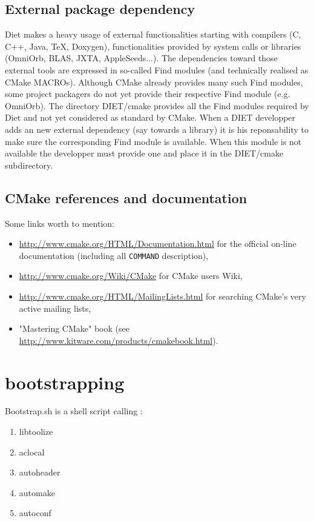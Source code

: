 \subsection{External package dependency}
Diet makes a heavy usage of external functionalities starting with
compilers (C, C++, Java, TeX, Doxygen), functionalities provided by system
calls or libraries (OmniOrb, BLAS, JXTA, AppleSeeds...).
The dependencies toward those external tools are expressed in so-called
Find modules (and technically realised as CMake MACROs).
Although CMake already provides many such Find modules, some project 
packagers do not yet provide their respective Find module (e.g. OmniOrb).
The directory DIET/cmake provides all the Find modules required by Diet
and not yet considered as standard by CMake.
When a DIET developper adds an new external dependency (say towards a
library) it is his reponsability to make sure the corresponding 
Find module is available. When this module is not available the
developper must provide one and place it in the DIET/cmake subdirectory.

\subsection{CMake references and documentation}
Some links worth to mention:
\begin{itemize}
\item \url{http://www.cmake.org/HTML/Documentation.html} for the official
      on-line documentation (including all \texttt{COMMAND} description),
\item \url{http://www.cmake.org/Wiki/CMake} for CMake users Wiki,
\item \url{http://www.cmake.org/HTML/MailingLists.html} for searching
      CMake's very active mailing lists,
\item "Mastering CMake" book (see
      \url{http://www.kitware.com/products/cmakebook.html}).
\end{itemize}

\section{bootstrapping}
Bootstrap.sh is a shell script calling :
\begin{enumerate}
\item{libtoolize}
\item{aclocal}
\item{autoheader}
\item{automake}
\item{autoconf}
\end{enumerate}

